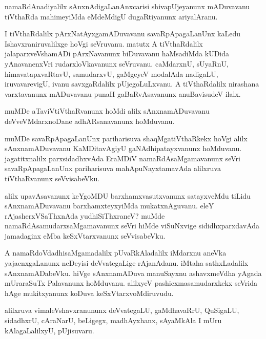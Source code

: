 \documentclass{article}
\begin{document}
\begin{mn}
namaRdAnadiyalilx sAnxnAdigaLanAnxcarisi shivapUjeyanunx mADuvavanu tiVthaRda mahimeyiMda 
eMdeMdigU dugaRtiyanunx ariyalAranu.
\end{mn}

\begin{mn}
I tiVthaRdalilx  pArxNatAyxgamADuvavanu savaRpApagaLanUnx kaLedu Ishavxraniruvalilxge hoVgi 
seVruvanu. matutx A tiVthaRdalilx jalaparxveVshamADi pArxNavanunx biDuvavanu haMsadiMda kUDida  
yAnavanenxVri rudarxloVkavanunx seVruvanu. caMdarxnU, sUyaRnU, himavatapxvaRtavU, samudarxvU, 
gaMgeyeV modalAda nadigaLU, iruvavarevigU, ivanu savxgaRdalilx pUjegoLuLxvanu. A tiVthaRdalilx 
nirashana varxtavanunx mADuvavanu punaH gaBaRvAsavanunx anuBavisudeV ilalx.
\end{mn}

\begin{mn}
muMDe aTaviVtiVthaRvanunx hoMdi alilx sAnxnamADuvavanu deVveVMdarxnoDane adhARsanavanunx hoMduvanu.
\end{mn}

\begin{mn}
muMDe savaRpApagaLanUnx pariharisuva shaqMgatiVthaRkekx hoVgi alilx sAnxnamADuvavanu KaMDitavAgiyU
gaNAdhipatayxvanunx hoMduvanu. jagatitxnalilx parxsidadhxvAda EraMDiV namaRdAsaMgamavanunx seVri 
savaRpApagaLanUnx pariharisuva mahApuNayxtamavAda alilxruva tiVthaRvanunx seVvisabeVku.
\end{mn}

\begin{mn}
alilx upavAsavanunx keYgoMDU barxhamxvasutxvanunx satayxveMdu tiLidu sAnxnamADuvavanu 
barxhamxteyxyiMda mukatxnAguvanu. eleY rAjasherxVSaThxnAda yudhiSiThxraneV? muMde 
namaRdAsamudarxsaMgamavanunx seVri hiMde viSuNxvige sididhxparxdavAda jamadaginx eMba 
keSxVtarxvanunx seVvisabeVku.
\end{mn}

\begin{mn}
A namaRdoVdadhisaMgamadalilx pUvaRkAladalilx iMdarxnu aneVka yajacnxgaLanunx neDeyisi deVvategaLige 
rAjanAdanu. iMtaha sathxLadalilx sAnxnamADabeVku. hiVge sAnxnamADuva manuSayxnu ashavxmeVdha 
yAgada mUraraSuTx Palavanunx hoMduvanu. alilxyeV pashicxmasamudarxkekx seVrida hAge mukitxyanunx 
koDuva keSxVtarxvoMdiruvudu.
\end{mn}

\begin{mn}
alilxruva vimaleVshavxranununx deVvategaLU, gaMdhavaRrU, QuSigaLU, sidadhxrU, cAraNarU, beLigegx,
madhAyxhanx, sAyaMkAla I mUru kAlagaLalilxyU, pUjisuvaru.
\end{mn}
\end{document}
